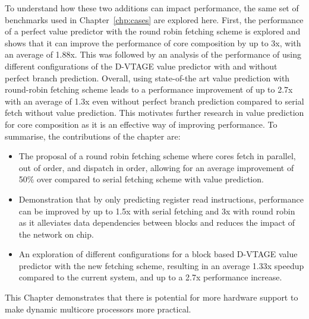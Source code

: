 To understand how these two additions can impact performance, the same set of benchmarks used in Chapter~\ref{chp:cases} are explored here.
First, the performance of a perfect value predictor with the round robin fetching scheme is explored and shows that it can improve the performance of core composition by up to 3x, with an average of 1.88x.
This was followed by an analysis of the performance of using different configurations of the D-VTAGE value predictor with and without perfect branch prediction.
Overall, using state-of-the art value prediction with round-robin fetching scheme leads to a performance improvement of up to 2.7x with an average of 1.3x even without perfect branch prediction compared to serial fetch without value prediction.
This motivates further research in value prediction for core composition as it is an effective way of improving performance.
To summarise, the contributions of the chapter are:
\vspace{-0.5em}
\begin{itemize}
\item The proposal of a round robin fetching scheme where cores fetch in parallel, out of order, and dispatch in order, allowing for an average improvement of 50\% over compared to serial fetching scheme with value prediction.
\vspace{-0.5em}
\item Demonstration that by only predicting register read instructions, performance can be improved by up to 1.5x with serial fetching and 3x with round robin as it alleviates data dependencies between blocks and reduces the impact of the network on chip.
\vspace{-0.5em}
\item An exploration of different configurations for a block based D-VTAGE value predictor with the new fetching scheme, resulting in an average 1.33x speedup compared to the current system, and up to a 2.7x performance increase.
\end{itemize}

This Chapter demonstrates that there is potential for more hardware support to make dynamic multicore processors more practical.

